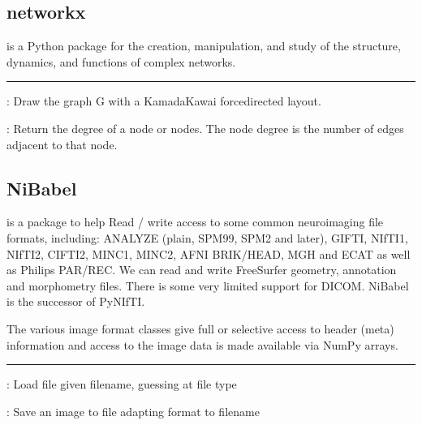 \documentclass[letterpaper,10pt,english]{sphinxmanual}
\begin{document}
\subsection{networkx}
\label{\detokenize{content/Glossary:networkx}}
 is a Python package for the creation, manipulation, and study of the structure, dynamics, and functions of complex networks.



\bigskip\hrule\bigskip


: Draw the graph G with a Kamada\sphinxhyphen{}Kawai force\sphinxhyphen{}directed layout.

: Return the degree of a node or nodes. The node degree is the number of edges adjacent to that node.


\subsection{NiBabel}
\label{\detokenize{content/Glossary:nibabel}}
 is a package to help Read / write access to some common neuroimaging file formats, including: ANALYZE (plain, SPM99, SPM2 and later), GIFTI, NIfTI1, NIfTI2, CIFTI\sphinxhyphen{}2, MINC1, MINC2, AFNI BRIK/HEAD, MGH and ECAT as well as Philips PAR/REC. We can read and write FreeSurfer geometry, annotation and morphometry files. There is some very limited support for DICOM. NiBabel is the successor of PyNIfTI.

The various image format classes give full or selective access to header (meta) information and access to the image data is made available via NumPy arrays.



\bigskip\hrule\bigskip


: Load file given filename, guessing at file type

: Save an image to file adapting format to filename
\end{document}
